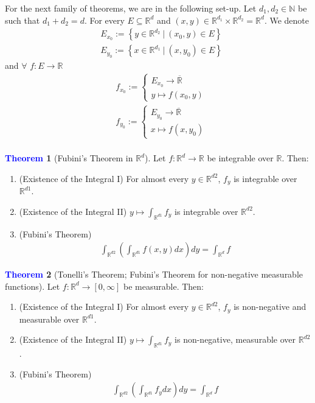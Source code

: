 \documentclass[11pt]{article}
\theoremstyle{definition}
\newcommand{\rd}[0]{\mathbb{R}^d}
\newcommand{\bb}[1]{\mathbb{#1}}
\newcommand{\sets}[2]{ \left\{ #1\ |\ #2 \right\}}
\newtheorem{theorem}{\textcolor{blue}{Theorem}}
\theoremstyle{definition}
\theoremstyle{remark}
\begin{document}
For the next family of theorems, we are in the following set-up. Let $d_1 , d_2 \in \bb{N}$ be such that $d_1 + d_2 = d$. For every $E \subseteq \rd$ and $(x,y) \in \bb{R}^{d_1} \times \bb{R}^{d_2}  = \rd$. We denote
\begin{align*}
	& E_{x_0} := \sets{y \in \bb{R}^{d_2} }{(x_0, y) \in E}	 \\
	& E_{y_0} := \sets{x \in \bb{R}^{d_1} }{(x, y_0) \in E}
\end{align*}
and $\forall$ $f: E \rightarrow \bb{R}$
\begin{align*}
	& f_{x_0} := \begin{cases}
		E_{x_0} \rightarrow \overline{\bb{R}} \\
		y \mapsto f(x_0, y) 
	\end{cases}	 \\
	& f_{y_0} := \begin{cases}
		E_{y_0} \rightarrow \overline{\bb{R}} \\
		x \mapsto f(x, y_0) 
	\end{cases}	 \\
\end{align*}


\begin{theorem}[Fubini's Theorem in $\rd$] 
	Let $f: \rd \rightarrow \bb{R}$ be integrable over $\bb{R}$. Then: 
	\begin{enumerate}[noitemsep]
		\item (Existence of the Integral I) For almost every $y \in \bb{R}^{d2}$, $f_y$ is integrable over $\bb{R}^{d1}$. 
		\item (Existence of the Integral II) $y \mapsto \int_{\bb{R}^{d1}} f_y$ is integrable over $\bb{R}^{d2}$. 
		\item (Fubini's Theorem)
		\begin{align}
			\int_{\bb{R}^{d2}} \left( 	\int_{\bb{R}^{d1}} f(x,y) dx 	\right) dy = \int_{\bb{R}^d} f 
		\end{align}
	\end{enumerate}
\end{theorem}

\begin{theorem}[Tonelli's Theorem; Fubini's Theorem for non-negative measurable functions]
Let $f: \rd \rightarrow [0, \infty]$ be measurable. Then:  
	\begin{enumerate}[noitemsep]
		\item (Existence of the Integral I) For almost every $y \in \bb{R}^{d2}$, $f_y$ is non-negative and measurable over $\bb{R}^{d1}$. 
		\item (Existence of the Integral II) $y \mapsto \int_{\bb{R}^{d1}} f_y$ is non-negative, measurable over $\bb{R}^{d2}$. 
		\item (Fubini's Theorem)
		\begin{align}
			\int_{\bb{R}^{d2}} \left( 	\int_{\bb{R}^{d1}} f_y dx 	\right) dy = \int_{\bb{R}^d} f 
		\end{align}
	\end{enumerate}
\end{theorem}
\end{document}
